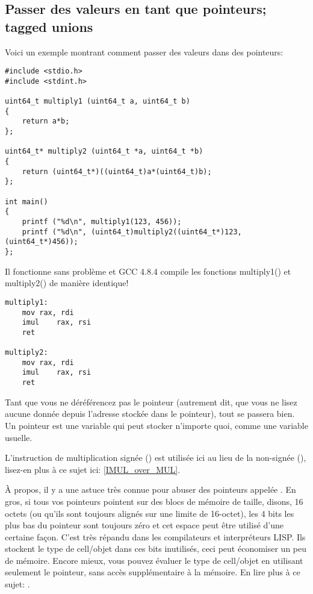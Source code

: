 \subsection{Passer des valeurs en tant que pointeurs; tagged unions}

Voici un exemple montrant comment passer des valeurs dans des pointeurs:

\begin{lstlisting}[label=unsigned_multiply_C,style=customc]
#include <stdio.h>
#include <stdint.h>

uint64_t multiply1 (uint64_t a, uint64_t b)
{
	return a*b;
};

uint64_t* multiply2 (uint64_t *a, uint64_t *b)
{
	return (uint64_t*)((uint64_t)a*(uint64_t)b);
};

int main()
{
	printf ("%d\n", multiply1(123, 456));
	printf ("%d\n", (uint64_t)multiply2((uint64_t*)123, (uint64_t*)456));
};
\end{lstlisting}

Il fonctionne sans problème et GCC 4.8.4 compile les fonctions multiply1() et multiply2()
de manière identique!

\begin{lstlisting}[label=unsigned_multiply_lst,style=customasmx86]
multiply1:
	mov	rax, rdi
	imul	rax, rsi
	ret

multiply2:
	mov	rax, rdi
	imul	rax, rsi
	ret
\end{lstlisting}

Tant que vous ne déréférencez pas le pointeur (autrement dit, que vous ne lisez aucune
donnée depuis l'adresse stockée dans le pointeur), tout se passera bien.
Un pointeur est une variable qui peut stocker n'importe quoi, comme une variable
usuelle.

L'instruction de multiplication signée (\IMUL) est utilisée ici au lieu de la non-signée
(\MUL), lisez-en plus à ce sujet ici:
\ref{IMUL_over_MUL}.

À propos, il y a une astuce très connue pour abuser des pointeurs appelée .
En gros, si tous vos pointeurs pointent sur des blocs de mémoire de taille, disons,
16 octets (ou qu'ils sont toujours alignés sur une limite de 16-octet), les 4 bits
les plus bas du pointeur sont toujours zéro et cet espace peut être utilisé d'une
certaine façon.
C'est très répandu dans les compilateurs et interpréteurs LISP.
Ils stockent le type de cell/objet dans ces bits inutilisés, ceci peut économiser
un peu de mémoire.
Encore mieux, vous pouvez évaluer le type de cell/objet en utilisant seulement le pointeur,
sans accès supplémentaire à la mémoire.
En lire plus à ce sujet: .

